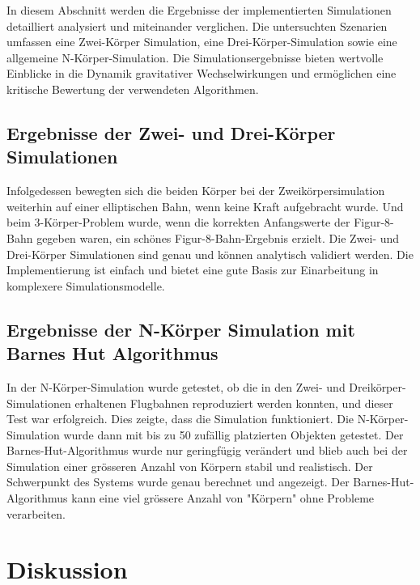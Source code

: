 \documentclass[a4paper,12pt,twoside]{article}
\begin{document}
In diesem Abschnitt werden die Ergebnisse der implementierten 
Simulationen detailliert analysiert und miteinander verglichen. 
Die untersuchten Szenarien umfassen eine Zwei-Körper Simulation, 
eine Drei-Körper-Simulation sowie eine allgemeine N-Körper-Simulation. 
Die Simulationsergebnisse bieten wertvolle Einblicke in die Dynamik 
gravitativer Wechselwirkungen und ermöglichen eine kritische Bewertung 
der verwendeten Algorithmen. 

\subsection{Ergebnisse der Zwei- und Drei-Körper Simulationen}
Infolgedessen bewegten sich die beiden Körper bei der Zweikörpersimulation 
weiterhin auf einer elliptischen Bahn, wenn keine Kraft aufgebracht wurde. 
Und beim 3-Körper-Problem wurde, wenn die korrekten Anfangswerte der 
Figur-8-Bahn gegeben waren, ein schönes Figur-8-Bahn-Ergebnis erzielt. 
Die Zwei- und Drei-Körper Simulationen sind genau und können analytisch 
validiert werden. Die Implementierung ist einfach und bietet eine gute 
Basis zur Einarbeitung in komplexere Simulationsmodelle.

\subsection{Ergebnisse der N-Körper Simulation mit Barnes Hut Algorithmus}
In der N-Körper-Simulation wurde getestet, ob die in den Zwei- und 
Dreikörper-Simulationen erhaltenen Flugbahnen reproduziert werden konnten, 
und dieser Test war erfolgreich. Dies zeigte, dass die Simulation 
funktioniert. Die N-Körper-Simulation wurde dann mit bis zu 50 
zufällig platzierten Objekten getestet. Der Barnes-Hut-Algorithmus 
wurde nur geringfügig verändert und blieb auch bei der Simulation 
einer grösseren Anzahl von Körpern stabil und realistisch. 
Der Schwerpunkt des Systems wurde genau berechnet und angezeigt. 
Der Barnes-Hut-Algorithmus kann eine viel grössere Anzahl von "Körpern"
ohne Probleme verarbeiten.


\section{Diskussion}
\end{document}
